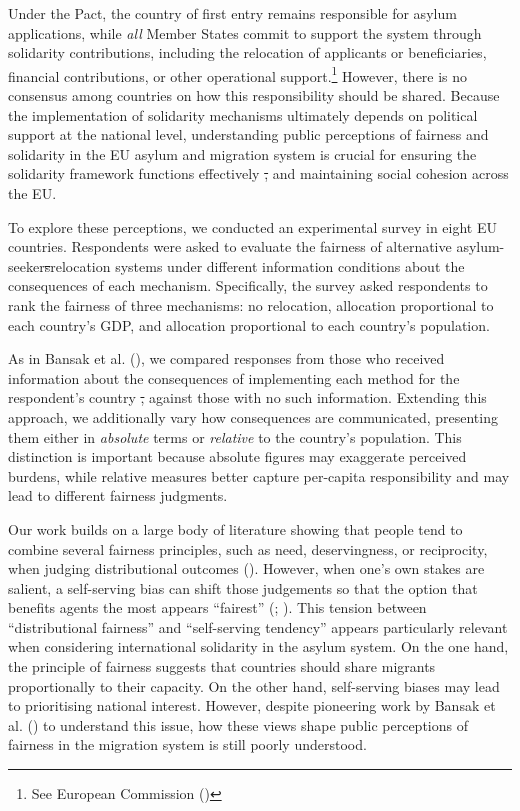 \documentclass[
  12pt,
  a4paper,
]{article}
\makeatletter
\providecommand{\DIFdel}[1]{{\protect\color{red}\sout{#1}}} %
\providecommand{\DIFdelbegin}{} %
\providecommand{\DIFdelend}{} %
\providecommand{\DIFscaledelfig}{0.5}
\newlength{\DIFdelgraphicswidth} %
\newlength{\DIFdelgraphicsheight} %
\providecommand{\DIFdelincludegraphics}[2][]{%
\sbox{\DIFdelgraphicsbox}{\DIFOincludegraphics[#1]{#2}}%
\settoboxwidth{\DIFdelgraphicswidth}{\DIFdelgraphicsbox} %
\settoboxtotalheight{\DIFdelgraphicsheight}{\DIFdelgraphicsbox} %
\scalebox{\DIFscaledelfig}{%
\parbox[b]{\DIFdelgraphicswidth}{\usebox{\DIFdelgraphicsbox}\\[-\baselineskip] \rule{\DIFdelgraphicswidth}{0em}}\llap{\resizebox{\DIFdelgraphicswidth}{\DIFdelgraphicsheight}{%
\setlength{\unitlength}{\DIFdelgraphicswidth}%
\begin{picture}(1,1)%
\thicklines\linethickness{2pt} %
{\color[rgb]{1,0,0}\put(0,0){\framebox(1,1){}}}%
{\color[rgb]{1,0,0}\put(0,0){\line( 1,1){1}}}%
{\color[rgb]{1,0,0}\put(0,1){\line(1,-1){1}}}%
\end{picture}%
}\hspace*{3pt}}} %
} %
\DeclareRobustCommand{\DIFdelbegin}{\DIFOdelbegin \let\includegraphics\DIFdelincludegraphics} %
\DeclareRobustCommand{\DIFdelend}{\DIFOaddend \let\includegraphics\DIFOincludegraphics} %
\let\sout@orig\sout %
\renewcommand{\sout}[1]{\ifmmode\text{\sout@orig{\ensuremath{#1}}}\else\sout@orig{#1}\fi} %
\makeatother
\begin{document}
Under the Pact, the country of first entry remains responsible for asylum applications, while \emph{all} Member States commit to support the system through solidarity contributions, including the relocation of applicants or beneficiaries, financial contributions, or other operational support.\footnote{See European Commission ()} However, there is no consensus among countries on how this responsibility should be shared. Because the implementation of solidarity mechanisms ultimately depends on political support at the national level, understanding public perceptions of fairness and solidarity in the EU asylum and migration system is crucial for ensuring the solidarity framework functions effectively \DIFdelbegin \DIFdel{, }\DIFdelend and maintaining social cohesion across the EU.

To explore these perceptions, we conducted an experimental survey in eight EU countries. Respondents were asked to evaluate the fairness of alternative asylum-seeker\DIFdelbegin \DIFdel{s}\DIFdelend  relocation systems under different information conditions about the consequences of each mechanism. Specifically, the survey asked respondents to rank the fairness of three mechanisms: no relocation, allocation proportional to each country's GDP, and allocation proportional to each country's population.

As in Bansak et al. (), we compared responses from those who received information about the consequences of implementing each method for the respondent's country \DIFdelbegin \DIFdel{, }\DIFdelend against those with no such information. Extending this approach, we additionally vary how consequences are communicated, presenting them either in \emph{absolute} terms or \emph{relative} to the country's population. This distinction is important because absolute figures may exaggerate perceived burdens, while relative measures better capture per-capita responsibility and may lead to different fairness judgments.

Our work builds on a large body of literature showing that people tend to combine several fairness principles, such as need, deservingness, or reciprocity, when judging distributional outcomes (). However, when one's own stakes are salient, a self-serving bias can shift those judgements so that the option that benefits agents the most appears ``fairest'' (; ). This tension between ``distributional fairness'' and ``self-serving tendency'' appears particularly relevant when considering international solidarity in the asylum system. On the one hand, the principle of fairness suggests that countries should share migrants proportionally to their capacity. On the other hand, self-serving biases may lead to prioritising national interest. However, despite pioneering work by Bansak et al. () to understand this issue, how these views shape public perceptions of fairness in the migration system is still poorly understood.
\end{document}
